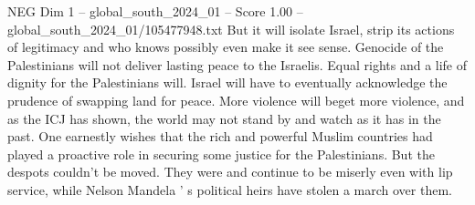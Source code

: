 \begin{textsample}{NEG Dim 1 – global\_south\_2024\_01 – Score 1.00 – global\_south\_2024\_01/105477948.txt}
But it will isolate Israel, strip its actions of legitimacy and who knows possibly even make it see sense.
Genocide of the Palestinians will not deliver lasting peace to the Israelis.
Equal rights and a life of dignity for the Palestinians will.
Israel will have to eventually acknowledge the prudence of swapping land for peace.
More violence will beget more violence, and as the ICJ has shown, the world may not stand by and watch as it has in the past.
One earnestly wishes that the rich and powerful Muslim countries had played a proactive role in securing some justice for the Palestinians.
But the despots couldn't be moved.
They were and continue to be miserly even with lip service, while Nelson Mandela ' s political heirs have stolen a march over them.

\end{textsample}
